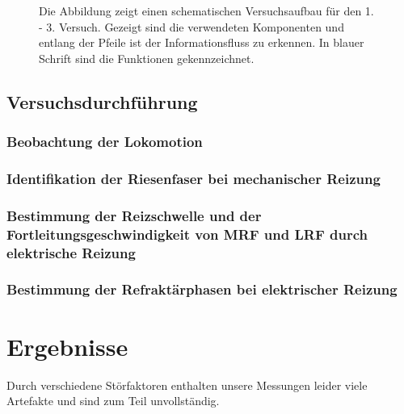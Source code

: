 \documentclass[11pt]{article}
\begin{document}
\begin{figure}[H]
\caption{Die Abbildung zeigt einen schematischen Versuchsaufbau für den 1. - 3. Versuch. Gezeigt sind die verwendeten Komponenten und entlang der Pfeile ist der Informationsfluss zu erkennen. In blauer Schrift sind die Funktionen gekennzeichnet. }
\label{schema}
\end{figure}

\subsection{Versuchsdurchführung}

\subsubsection{Beobachtung der Lokomotion}

\subsubsection{Identifikation der Riesenfaser bei mechanischer Reizung}

\subsubsection{Bestimmung der Reizschwelle und der Fortleitungsgeschwindigkeit von MRF und LRF durch elektrische Reizung}

\subsubsection{Bestimmung der Refraktärphasen bei elektrischer Reizung}

\section{Ergebnisse}
Durch verschiedene Störfaktoren enthalten unsere Messungen leider viele Artefakte und sind zum Teil unvollständig.  \\
\end{document}
